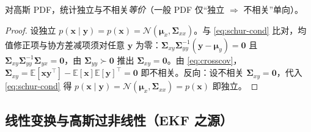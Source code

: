 \begin{theorem}\label{thm:gauss-indep}
对高斯 PDF，统计独立与不相关\emph{等价}（一般 PDF 仅“独立 $\Rightarrow$ 不相关”单向）。
\end{theorem}
\begin{proof}
设独立 $p(\mathbf{x}\mid\mathbf{y})=p(\mathbf{x})=\mathcal{N}(\boldsymbol{\mu}_x,\boldsymbol{\Sigma}_{xx})$。与 \cref{eq:schur-cond} 比对，均值修正项与协方差减项须对任意 $\mathbf{y}$ 为零：$\boldsymbol{\Sigma}_{xy}\boldsymbol{\Sigma}_{yy}^{-1}(\mathbf{y}-\boldsymbol{\mu}_y)=\mathbf{0}$ 且 $\boldsymbol{\Sigma}_{xy}\boldsymbol{\Sigma}_{yy}^{-1}\boldsymbol{\Sigma}_{yx}=\mathbf{0}$，由 $\boldsymbol{\Sigma}_{yy}\succ\mathbf{0}$ 推出 $\boldsymbol{\Sigma}_{xy}=\mathbf{0}$。由 \cref{eq:crosscov}，$\boldsymbol{\Sigma}_{xy}=\mathbb{E}[\mathbf{x}\mathbf{y}^\top]-\mathbb{E}[\mathbf{x}]\mathbb{E}[\mathbf{y}]^\top=\mathbf{0}$ 即不相关。反向：设不相关 $\boldsymbol{\Sigma}_{xy}=\mathbf{0}$，代入 \cref{eq:schur-cond} 得 $p(\mathbf{x}\mid\mathbf{y})=\mathcal{N}(\boldsymbol{\mu}_x,\boldsymbol{\Sigma}_{xx})=p(\mathbf{x})$ 即独立。
\end{proof}

\subsection{线性变换与高斯过非线性（EKF 之源）}
\label{sec:est-lin-change}

